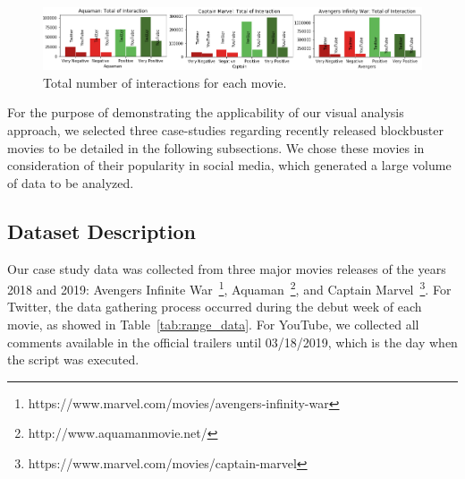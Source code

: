 
\begin{figure}[htb]
\begin{center}
\includegraphics[width=1.0\linewidth]{img/TotalInteractions2.png}
\end{center}
   \caption{Total number of interactions for each movie.}
\label{fig:TotalOfInteractions}
\end{figure}

For the purpose of demonstrating the applicability of our visual analysis approach, we selected three case-studies regarding recently released blockbuster movies to be detailed in the following subsections. We chose these movies in consideration of their popularity in social media, which generated a large volume of data to be analyzed.

\subsection{Dataset Description}



Our case study data was collected from three major movies releases of the years 2018 and 2019: Avengers Infinite War~\footnote{https://www.marvel.com/movies/avengers-infinity-war}, Aquaman~\footnote{http://www.aquamanmovie.net/}, and Captain Marvel~\footnote{https://www.marvel.com/movies/captain-marvel}. For Twitter, the data gathering process occurred during the debut week of each movie, as showed in Table~\ref{tab:range_data}. For YouTube, we collected all comments available in the official trailers until 03/18/2019, which is the day when the script was executed. 

